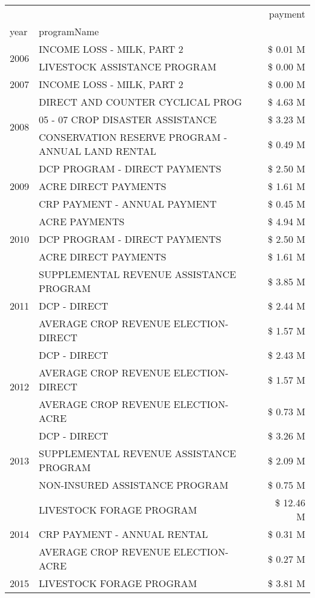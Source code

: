 \begin{tabular}{llr}
\toprule
 &  & payment \\
year & programName &  \\
\midrule
\multirow[t]{2}{*}{2006} & INCOME LOSS - MILK, PART 2 & \$ 0.01 M \\
 & LIVESTOCK ASSISTANCE PROGRAM & \$ 0.00 M \\
\cline{1-3}
2007 & INCOME LOSS - MILK, PART 2 & \$ 0.00 M \\
\cline{1-3}
\multirow[t]{3}{*}{2008} & DIRECT AND COUNTER CYCLICAL PROG & \$ 4.63 M \\
 & 05 - 07 CROP DISASTER ASSISTANCE & \$ 3.23 M \\
 & CONSERVATION RESERVE PROGRAM - ANNUAL LAND RENTAL & \$ 0.49 M \\
\cline{1-3}
\multirow[t]{3}{*}{2009} & DCP PROGRAM - DIRECT PAYMENTS & \$ 2.50 M \\
 & ACRE DIRECT PAYMENTS & \$ 1.61 M \\
 & CRP PAYMENT - ANNUAL PAYMENT & \$ 0.45 M \\
\cline{1-3}
\multirow[t]{3}{*}{2010} & ACRE PAYMENTS & \$ 4.94 M \\
 & DCP PROGRAM - DIRECT PAYMENTS & \$ 2.50 M \\
 & ACRE DIRECT PAYMENTS & \$ 1.61 M \\
\cline{1-3}
\multirow[t]{3}{*}{2011} & SUPPLEMENTAL REVENUE ASSISTANCE PROGRAM & \$ 3.85 M \\
 & DCP - DIRECT & \$ 2.44 M \\
 & AVERAGE CROP REVENUE ELECTION-DIRECT & \$ 1.57 M \\
\cline{1-3}
\multirow[t]{3}{*}{2012} & DCP - DIRECT & \$ 2.43 M \\
 & AVERAGE CROP REVENUE ELECTION-DIRECT & \$ 1.57 M \\
 & AVERAGE CROP REVENUE ELECTION-ACRE & \$ 0.73 M \\
\cline{1-3}
\multirow[t]{3}{*}{2013} & DCP - DIRECT & \$ 3.26 M \\
 & SUPPLEMENTAL REVENUE ASSISTANCE PROGRAM & \$ 2.09 M \\
 & NON-INSURED ASSISTANCE PROGRAM & \$ 0.75 M \\
\cline{1-3}
\multirow[t]{3}{*}{2014} & LIVESTOCK FORAGE PROGRAM & \$ 12.46 M \\
 & CRP PAYMENT - ANNUAL RENTAL & \$ 0.31 M \\
 & AVERAGE CROP REVENUE ELECTION-ACRE & \$ 0.27 M \\
\cline{1-3}
\multirow[t]{3}{*}{2015} & LIVESTOCK FORAGE PROGRAM & \$ 3.81 M \\

\end{tabular}
